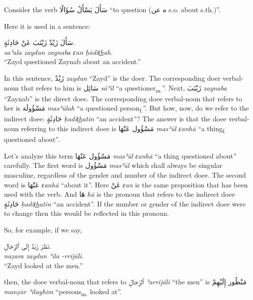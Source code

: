 \documentclass[
  10pt,
]{book}
\begin{document}
Consider the verb
\foreignlanguage{arabic}{سَأَلَ يَسْأَلُ سُؤَالًا} \enquote{to question (\foreignlanguage{arabic}{ه عن} s.o. about s.th.)}.

Here it is used in a sentence:

\foreignlanguage{arabic}{سَأَلَ زَيْدٌ زَيْنَبَ عَنْ حَادِثَةٍ.}\\
\emph{saʾala zaydun zaynaba ɛan ḥādit͟hah.}\\
\enquote{Zayd questioned Zaynab about an accident.}

In this sentence, \foreignlanguage{arabic}{زَيْدٌ} \emph{zaydun} \enquote{Zayd} is the doer. The corresponding doer verbal-noun that refers to him is \foreignlanguage{arabic}{سَائِل} \emph{sāʾil} \enquote{a questioner\textsubscript{m.}}.
Next, \foreignlanguage{arabic}{زَيْنَبَ} \emph{zaynaba} \enquote{Zaynab} is the direct doee. The corresponding doee verbal-noun that refers to her is \foreignlanguage{arabic}{مَسْؤُولَة} \emph{masʾūlah} \enquote{a questioned person\textsubscript{f.}}.
But how, now, do we refer to the indirect doee: \foreignlanguage{arabic}{حَادِثَةٍ} \emph{ḥadit͟hatin} \enquote{an accident}? The answer is that the doee verbal-noun referring to this indirect doee is \foreignlanguage{arabic}{مَسْؤُول عَنْهَا} \emph{masʾūl ɛanhā} \enquote{a thing\textsubscript{f.} questioned about}.

Let's analyze this term \foreignlanguage{arabic}{مَسْؤُول عَنْهَا} \emph{masʾūl ɛanhā} \enquote{a thing questioned about} carefully. The first word is \foreignlanguage{arabic}{مَسْؤُول} \emph{masʾūl} which shall always be singular masculine, regardless of the gender and number of the indirect doee. The second word is \foreignlanguage{arabic}{عَنْهَا} \emph{ɛanhā} \enquote{about it}. Here \foreignlanguage{arabic}{عَنْ} \emph{ɛan} is the same preposition that has been used with the verb. And \foreignlanguage{arabic}{هَا} \emph{hā} is the pronoun that refers to the indirect doee \foreignlanguage{arabic}{حَادِثَةٍ} \emph{ḥadit͟hatin} \enquote{an accident}. If the number or gender of the indirect doee were to change then this would be reflected in this pronoun.

So, for example, if we say,

\foreignlanguage{arabic}{نَظَرَ زَيْدٌ إِلَى ٱلرِّجَالِ.}\\
\emph{naẓara zaydun ʾila -rrijāli.}\\
\enquote{Zayd looked at the men.}

then, the doee verbal-noun that refers to \foreignlanguage{arabic}{ٱلرِّجَالِ} \emph{ʾarrijāli} \enquote{the men} is \foreignlanguage{arabic}{مَنْظُور إِلَيْهِمْ} \emph{manẓūr ʾilayhim} \enquote{persons\textsubscript{m.} looked at}.
\end{document}
